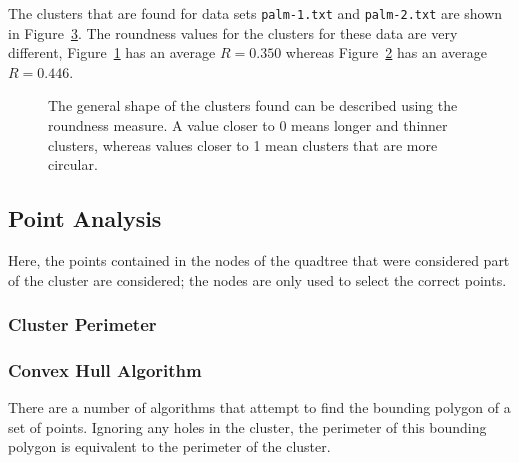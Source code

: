 The clusters that are found for data sets \texttt{palm-1.txt} and
\texttt{palm-2.txt} are shown in Figure~\ref{fig:roundness}. The roundness
values for the clusters for these data are very different,
Figure~\ref{fig:roundness-long.png} has an average $R=0.350$ whereas
Figure~\ref{fig:roundness-round.png} has an average $R=0.446$.

\begin{figure}[tbhp]
	\centering
	\begin{subfigure}[b]{4.2cm}
		\caption{}\label{fig:roundness-long.png}
	\end{subfigure}%
	\quad
	\begin{subfigure}[b]{4.2cm}
		\caption{}\label{fig:roundness-round.png}
	\end{subfigure}

	\caption[A comparison of roundness values.]{The general shape of the
		clusters found can be described using the roundness measure. A value
		closer to 0 means longer and thinner clusters, whereas values closer to
		1 mean clusters that are more circular.}\label{fig:roundness}
\end{figure}

\subsection{Point Analysis}
\label{sub:point_analysis}

Here, the points contained in the nodes of the quadtree that were considered
part of the cluster are considered; the nodes are only used to select the
correct points.

\subsubsection{Cluster Perimeter}
\label{ssub:cluster_perimeter_point}

\subsubsection*{Convex Hull Algorithm}
\label{ssub:Convex Hull Algorithm}

There are a number of algorithms that attempt to find the bounding polygon of a
set of points. Ignoring any holes in the cluster, the perimeter of this
bounding polygon is equivalent to the perimeter of the cluster.

